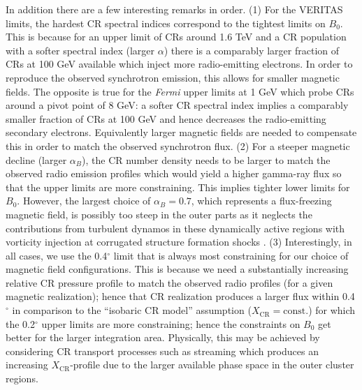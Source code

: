 \documentclass[12pt,manuscript]{aastex}
\newcommand{\rmn}{\mathrm}
\newcommand{\CR}{\mathrm{CR}}
\begin{document}
In addition there are a few interesting remarks in order. (1) For the VERITAS limits, the hardest CR spectral indices correspond to the tightest limits on $B_0$. This is because for an upper limit of CRs around 1.6 TeV and a CR population with a softer spectral index (larger $\alpha$) there is a comparably larger fraction of CRs at 100 GeV available which inject more radio-emitting electrons. In order to reproduce the observed synchrotron emission, this allows for smaller magnetic fields. The opposite is true for the {\em Fermi} upper limits at 1 GeV which probe CRs around a pivot point of 8 GeV: a softer CR spectral index implies a comparably smaller fraction of CRs at 100 GeV and hence decreases the radio-emitting secondary electrons. Equivalently larger magnetic fields are needed to compensate this in order to match the observed synchrotron flux.  (2) For a steeper magnetic decline (larger $\alpha_{B}$), the CR number density needs to be larger to match the observed radio emission profiles which would yield a higher gamma-ray flux so that the upper limits are more constraining. This implies tighter lower limits for $B_{0}$. However, the largest choice of $\alpha_B=0.7$, which represents a flux-freezing magnetic field, is possibly too steep in the outer parts as it neglects the contributions from turbulent dynamos in these dynamically active regions with vorticity injection at corrugated structure formation shocks \citep{article:PfrommerJones:2011}. (3) Interestingly, in all cases, we use the 0.4$^{\circ}$ limit that is always most constraining for our choice of magnetic field configurations.  This is because we need a substantially increasing relative CR pressure profile to match the observed radio profiles (for a given magnetic realization); hence that CR realization produces a larger flux within 0.4$^{\circ}$ in comparison to the ``isobaric CR model'' assumption ($X_{\CR} = \rmn{const.}$) for which the 0.2$^{\circ}$ upper limits are more constraining; hence the
constraints on $B_{0}$ get better for the larger integration area. Physically, this may be achieved by considering CR transport processes such as streaming which produces an increasing $X_{\CR}$-profile due to the larger available phase space in the outer cluster regions.
\end{document}
